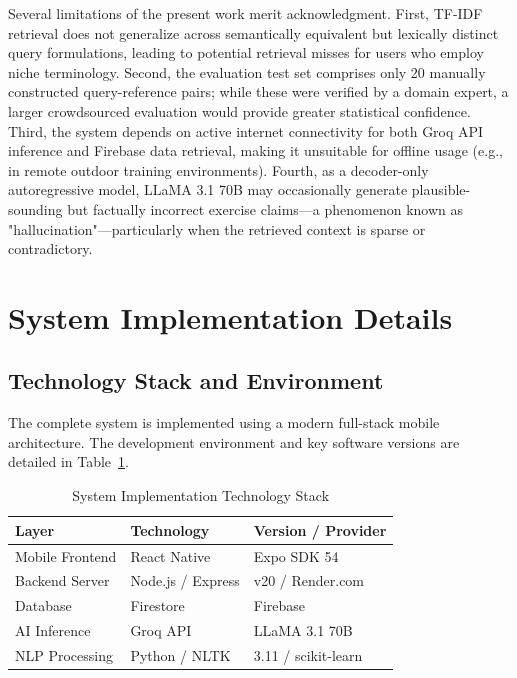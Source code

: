 \documentclass[conference]{IEEEtran}
\begin{document}
Several limitations of the present work merit acknowledgment. First, TF-IDF retrieval does not generalize across semantically equivalent but lexically distinct query formulations, leading to potential retrieval misses for users who employ niche terminology. Second, the evaluation test set comprises only 20 manually constructed query-reference pairs; while these were verified by a domain expert, a larger crowdsourced evaluation would provide greater statistical confidence. Third, the system depends on active internet connectivity for both Groq API inference and Firebase data retrieval, making it unsuitable for offline usage (e.g., in remote outdoor training environments). Fourth, as a decoder-only autoregressive model, LLaMA 3.1 70B may occasionally generate plausible-sounding but factually incorrect exercise claims—a phenomenon known as "hallucination"—particularly when the retrieved context is sparse or contradictory.

\section{System Implementation Details}

\subsection{Technology Stack and Environment}

The complete system is implemented using a modern full-stack mobile architecture. The development environment and key software versions are detailed in Table~\ref{tab:stack}.

\begin{table}[htbp]
\caption{System Implementation Technology Stack}
\label{tab:stack}
\centering
\begin{tabular}{lll}
\toprule
\textbf{Layer} & \textbf{Technology} & \textbf{Version / Provider} \\
\midrule
Mobile Frontend & React Native & Expo SDK 54 \\
Backend Server & Node.js / Express & v20 / Render.com \\
Database & Firestore & Firebase \\
AI Inference & Groq API & LLaMA 3.1 70B \\
NLP Processing & Python / NLTK & 3.11 / scikit-learn \\
\bottomrule
\end{tabular}
\end{table}
\end{document}
